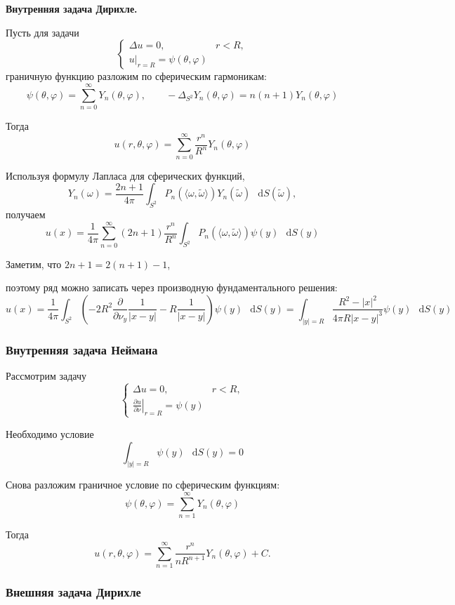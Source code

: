 \documentclass[11pt,a4paper]{report}
\numberwithin{equation}{section}
\numberwithin{figure}{chapter}
\numberwithin{table}{chapter}
\newcommand{\dd}{\mathop{}\!\mathrm{d}}
\begin{document}
\textbf{Внутренняя задача Дирихле.}\par\smallskip
Пусть для задачи
\[
\begin{cases}
\Delta u=0, & r<R,\\
u|_{r=R}=\psi(\theta,\varphi)
\end{cases}
\]
граничную функцию разложим по сферическим гармоникам:
\[
\psi(\theta,\varphi)
=
\sum_{n=0}^{\infty}Y_n(\theta,\varphi),
\qquad
-\Delta_{S^2}Y_n(\theta,\varphi)
=
n(n+1)Y_n(\theta,\varphi)
\]

Тогда
\[
u(r,\theta,\varphi)
=
\sum_{n=0}^{\infty}
\frac{r^n}{R^n}
Y_n(\theta,\varphi)
\]

Используя формулу Лапласа для сферических функций,
\[
Y_n(\omega)
=
\frac{2n+1}{4\pi}
\int_{S^2}
P_n\!\left(\langle\omega,\widetilde\omega\rangle\right)
Y_n(\widetilde\omega)\,\dd S(\widetilde\omega),
\]
получаем
\[
u(x)
=
\frac{1}{4\pi}
\sum_{n=0}^{\infty}
(2n+1)\frac{r^n}{R^n}
\int_{S^2}
P_n\!\left(\langle\omega,\widetilde\omega\rangle\right)
\psi(y)\,\dd S(y)
\]

Заметим, что
$
2n+1=2(n+1)-1
$,

поэтому ряд можно записать через производную фундаментального решения:
\[
u(x)
=
\frac{1}{4\pi}
\int_{S^2}
\left(
-2R^2
\frac{\partial}{\partial\nu_y}
\frac{1}{|x-y|}
-
R\frac{1}{|x-y|}
\right)
\psi(y)\,\dd S(y)=\int_{|y|=R}
\frac{R^2-|x|^2}{4\pi R|x-y|^3}
\psi(y)\,\dd S(y)\]

\subsubsection{Внутренняя задача Неймана}

Рассмотрим задачу
\[
\begin{cases}
\Delta u=0, & r<R,\\[1mm]
\displaystyle
\left.
\frac{\partial u}{\partial\nu}
\right|_{r=R}
=
\psi(y)
\end{cases}
\]

Необходимо условие 
\[
\int_{|y|=R}\psi(y)\,\dd S(y)=0
\]

Снова разложим граничное условие по сферическим функциям:
\[
\psi(\theta,\varphi)
=
\sum_{n=1}^{\infty}Y_n(\theta,\varphi)
\]

Тогда
\[
u(r,\theta,\varphi)
=
\sum_{n=1}^{\infty}
\frac{r^n}{nR^{n+1}}
Y_n(\theta,\varphi)
+C.
\]

\subsubsection{Внешняя задача Дирихле}
\end{document}

